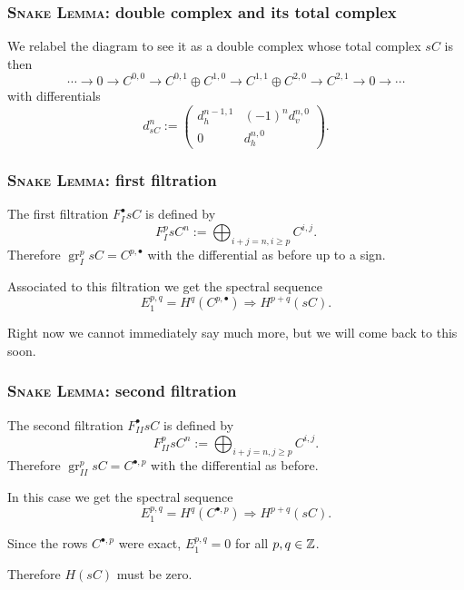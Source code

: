 \documentclass[notheorems]{beamer}
\theoremstyle{plain}
\theoremstyle{definition}
\theoremstyle{darkredexample}
\theoremstyle{remark}
\DeclareMathOperator{\gr}{gr}
\newcommand{\op}{\oplus}
\begin{document}
\begin{frame}
    \frametitle{\textsc{Snake Lemma}: double complex and its total complex}
    We relabel the diagram to see it as a double complex
    \pause
    whose total complex $sC$ is then
    \[ \cdots \to 0\to C^{0,0}\to C^{0,1}\op C^{1,0}\to C^{1,1}\op C^{2,0}\to C^{2,1}\to 0\to \cdots \]
    \pause
    with differentials
    \[ d_{sC}^{n}:=\begin{pmatrix}
	d_{h}^{n-1,1} & (-1)^{n}d_{v}^{n,0} \\
	0 & d_{h}^{n,0}
    \end{pmatrix}.
    \]
\end{frame}

\begin{frame}
    \frametitle{\textsc{Snake Lemma}: first filtration}
    The first filtration $F_{I}^{\bullet}sC$ is defined by
    \[ F_{I}^{p}sC^{n}:=\bigoplus_{i+j=n,i\geqslant p} C^{i,j}. \]
    \pause
    Therefore $\gr_{I}^{p}sC=C^{p,\bullet}$ with the differential as before up to a sign.
    \pause

    Associated to this filtration we get the spectral sequence
    \[ E_{1}^{p,q}=H^{q}(C^{p,\bullet})\Rightarrow H^{p+q}(sC). \]
    \pause

    Right now we cannot immediately say much more, but we will come back to this soon.
\end{frame}

\begin{frame}
    \frametitle{\textsc{Snake Lemma}: second filtration}
    The second filtration $F_{II}^{\bullet}sC$ is defined by
    \[ F_{II}^{p}sC^{n}:=\bigoplus_{i+j=n,j\geqslant p} C^{i,j}. \]
    \pause
    Therefore $\gr_{II}^{p}sC=C^{\bullet,p}$ with the differential as before.
    \pause

    In this case we get the spectral sequence
    \[ E_{1}^{p,q}=H^{q}(C^{\bullet,p})\Rightarrow H^{p+q}(sC). \]
    \pause

    Since the rows $C^{\bullet,p}$ were exact, $E_{1}^{p,q}=0$ for all $p,q\in \mathbb{Z}$.
    \pause

    Therefore $H(sC)$ must be zero.
\end{frame}
\end{document}
